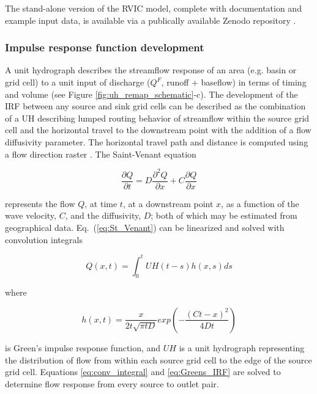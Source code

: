 \documentclass[jgrga, draft]{agutex}
\begin{document}
\begin{article}
The stand-alone version of the RVIC model, complete with documentation and example input data, is available via a publically available Zenodo repository \citep{Hamman_2015}.

\subsubsection{Impulse response function development}
\label{sec:irfs}

A unit hydrograph describes the streamflow response of an area (e.g. basin or grid cell) to a unit input of discharge ($Q^F$, runoff + baseflow) in terms of timing and volume (see Figure \ref{fig:uh_remap_schematic}-c).
The development of the IRF between any source and sink grid cells can be described as the combination of a UH describing lumped routing behavior of streamflow within the source grid cell and the horizontal travel to the downstream point with the addition of a flow diffusivity parameter.
The horizontal travel path and distance is computed using a flow direction raster \citep[e.g.][]{Wu_2011}.
The Saint-Venant equation

 \begin{equation}
   \label{eq:St_Venant}
   \frac{\partial Q}{\partial t} = D \frac{\partial^2 Q}{\partial x} + C \frac{\partial Q}{\partial x}
 \end{equation}

represents the flow $Q$, at time $t$, at a downstream point $x$, as a function of the wave velocity, $C$, and the diffusivity, $D$; both of which may be estimated from geographical data. Eq.~(\ref{eq:St_Venant}) can be linearized and solved with convolution integrals

 \begin{equation}
   \label{eq:conv_integral}
	  Q(x,t) = \int_0^t UH(t-s)h(x,s)ds
 \end{equation}

where

 \begin{equation}
   \label{eq:Greens_IRF}
	h(x, t) = \frac{x}{2t\sqrt{\pi tD}}exp\left(-\frac{(Ct-x)^2}{4Dt}\right)
 \end{equation}

is Green's impulse response function, and $UH$ is a unit hydrograph representing the distribution of flow from within each source grid cell to the edge of the source grid cell.
Equations \ref{eq:conv_integral} and \ref{eq:Greens_IRF} are solved to determine flow response from every source to outlet pair.


\end{article}
\end{document}
